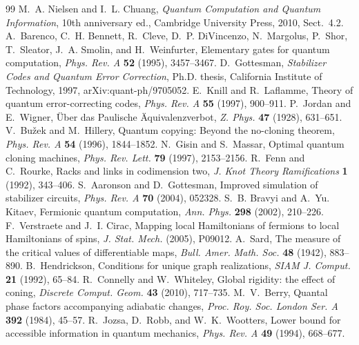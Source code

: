 \documentclass[11pt,reqno]{amsart}
\theoremstyle{definition}
\theoremstyle{remark}
\numberwithin{equation}{section}
\begin{document}
\begin{thebibliography}{99}
 M.~A. Nielsen and I.~L. Chuang, \emph{Quantum Computation and Quantum Information}, 10th anniversary ed., Cambridge University Press, 2010, Sect.~4.2.
 A.~Barenco, C.~H. Bennett, R.~Cleve, D.~P. DiVincenzo, N.~Margolus, P.~Shor, T.~Sleator, J.~A. Smolin, and H.~Weinfurter, Elementary gates for quantum computation, \emph{Phys. Rev. A} \textbf{52} (1995), 3457--3467.
 D.~Gottesman, \emph{Stabilizer Codes and Quantum Error Correction}, Ph.D. thesis, California Institute of Technology, 1997, arXiv:quant-ph/9705052.
 E.~Knill and R.~Laflamme, Theory of quantum error-correcting codes, \emph{Phys. Rev. A} \textbf{55} (1997), 900--911.
 P.~Jordan and E.~Wigner, \"Uber das Paulische \"Aquivalenzverbot, \emph{Z. Phys.} \textbf{47} (1928), 631--651.
 V.~Bu\v{z}ek and M.~Hillery, Quantum copying: Beyond the no-cloning theorem, \emph{Phys. Rev. A} \textbf{54} (1996), 1844--1852.
 N.~Gisin and S.~Massar, Optimal quantum cloning machines, \emph{Phys. Rev. Lett.} \textbf{79} (1997), 2153--2156.
 R.~Fenn and C.~Rourke, Racks and links in codimension two, \emph{J. Knot Theory Ramifications} \textbf{1} (1992), 343--406.
 S.~Aaronson and D.~Gottesman, Improved simulation of stabilizer circuits, \emph{Phys. Rev. A} \textbf{70} (2004), 052328.
 S.~B. Bravyi and A.~Yu. Kitaev, Fermionic quantum computation, \emph{Ann. Phys.} \textbf{298} (2002), 210--226.
 F.~Verstraete and J.~I. Cirac, Mapping local Hamiltonians of fermions to local Hamiltonians of spins, \emph{J. Stat. Mech.} (2005), P09012.
 A.~Sard, The measure of the critical values of differentiable maps, \emph{Bull. Amer. Math. Soc.} \textbf{48} (1942), 883--890.
 B.~Hendrickson, Conditions for unique graph realizations, \emph{SIAM J. Comput.} \textbf{21} (1992), 65--84.
 R.~Connelly and W.~Whiteley, Global rigidity: the effect of coning, \emph{Discrete Comput. Geom.} \textbf{43} (2010), 717--735.
 M.~V.~Berry, Quantal phase factors accompanying adiabatic changes, \emph{Proc. Roy. Soc. London Ser. A} \textbf{392} (1984), 45--57.
 R.~Jozsa, D.~Robb, and W.~K.~Wootters, Lower bound for accessible information in quantum mechanics, \emph{Phys. Rev. A} \textbf{49} (1994), 668--677.

\end{thebibliography}
\end{document}
